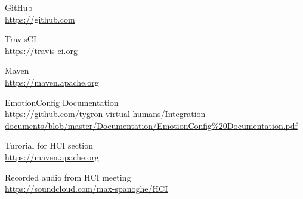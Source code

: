 \documentclass[11pt]{article}
\begin{document}
\begin{thebibliography}{9}
	GitHub\\
	\url{https://github.com }
	
	TravisCI\\
	\url{https://travis-ci.org }
	
	Maven\\
	\url{https://maven.apache.org }
	
	EmotionConfig Documentation\\
	\url{https://github.com/tygron-virtual-humans/Integration-documents/blob/master/Documentation/EmotionConfig\%20Documentation.pdf }
		
	Turorial for HCI section\\
	\url{https://maven.apache.org }
	
	Recorded audio from HCI meeting\\
	\url{https://soundcloud.com/max-spanoghe/HCI}

	
	
\end{thebibliography}
\end{document}
